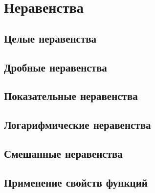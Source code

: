 \chapter{Неравенства}
	\section{Целые неравенства}
	\section{Дробные неравенства}
	\section{Показательные неравенства}
	\section{Логарифмические неравенства}
	\section{Смешанные неравенства}
	\section{Применение свойств функций}

